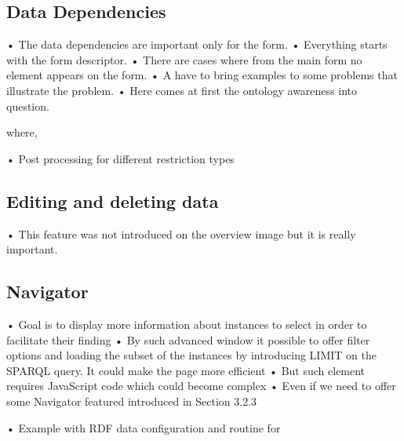 \subsection{Data Dependencies}


•	The data dependencies are important only for the form. 
•	Everything starts with the form descriptor.
•	There are cases where from the main form no element appears on the form.
•	A have to bring examples to some problems that illustrate the problem.
•	Here comes at first the ontology awareness into question.


where,



•	Post processing for different restriction types


\subsection{Editing and deleting data}

•	This feature was not introduced on the overview image but it is really important.



\subsection{Navigator}


•	Goal is to display more information about instances to select in order to facilitate their finding
•	By such advanced window it possible to offer filter options and loading the subset of the instances by introducing LIMIT on the SPARQL query. It could make the page more efficient
•	But such element requires JavaScript code which could become complex
•	Even if we need to offer some Navigator featured introduced in Section 3.2.3



•	Example with RDF data configuration and routine for 

